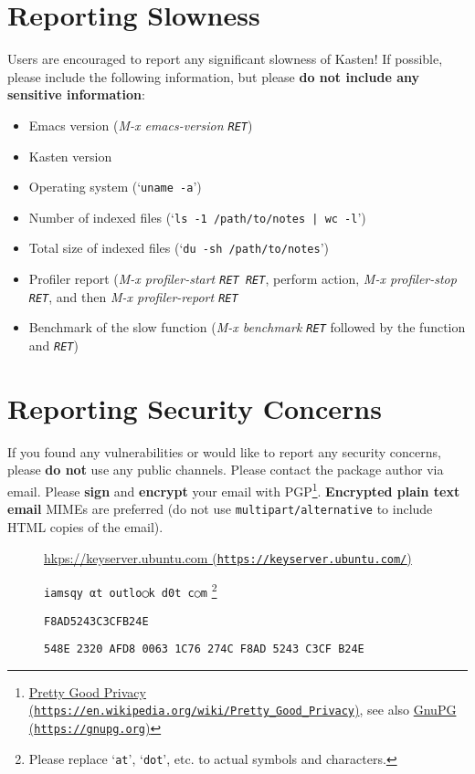 \documentclass{book}
\newcommand\Texinfocommandstyletextkbd[1]{{\ttfamily\textsl{#1}}}%
\renewcommand{\_}{\Texinfounderscore\discretionary{}{}{}}
\begin{document}
\section{{Reporting Slowness}}
\label{anchor:Reporting-Slowness}%

Users are encouraged to report any significant slowness of Kasten! If possible,
please include the following information, but please \textbf{do not include any
sensitive information}:
\begin{itemize}
\item Emacs version (\Texinfocommandstyletextkbd{M-x emacs-version \texttt{RET}})
\item Kasten version
\item Operating system (`\texttt{uname -a}')
\item Number of indexed files (`\texttt{ls -1 /path/to/notes | wc -l}')
\item Total size of indexed files (`\texttt{du -sh /path/to/notes}')
\item Profiler report (\Texinfocommandstyletextkbd{M-x profiler-start \texttt{RET}\ \texttt{RET}}, perform action,
\Texinfocommandstyletextkbd{M-x profiler-stop \texttt{RET}}, and then \Texinfocommandstyletextkbd{M-x profiler-report \texttt{RET}}
\item Benchmark of the slow function (\Texinfocommandstyletextkbd{M-x benchmark \texttt{RET}} followed by the
function and \Texinfocommandstyletextkbd{\texttt{RET}})
\end{itemize}

\section{{Reporting Security Concerns}}
\label{anchor:Reporting-Security-Concerns}%

If you found any vulnerabilities or would like to report any security concerns,
please \textbf{do not} use any public channels.  Please contact the package author via
email.  Please \textbf{sign} and \textbf{encrypt} your email with PGP\footnote{\href{https://en.wikipedia.org/wiki/Pretty_Good_Privacy}{Pretty Good Privacy (\nolinkurl{https://en.wikipedia.org/wiki/Pretty_Good_Privacy})},
see also \href{https://gnupg.org}{GnuPG (\nolinkurl{https://gnupg.org})}}.  \textbf{Encrypted plain text email} MIMEs are preferred (do not use
\texttt{multipart/alternative} to include HTML copies of the email).

\begin{description}
\item[{\parbox[b]{\linewidth}{%
Key Server}}]
\href{https://keyserver.ubuntu.com/}{hkps://keyserver.ubuntu.com (\nolinkurl{https://keyserver.ubuntu.com/})}
\item[{\parbox[b]{\linewidth}{%
Email Address}}]
\texttt{iamsqy αt outlo◯k d0t c○m} \footnote{Please replace `\texttt{at}', `\texttt{dot}', etc. to actual
symbols and characters.}
\item[{\parbox[b]{\linewidth}{%
Key ID}}]
\texttt{F8AD5243C3CFB24E}
\item[{\parbox[b]{\linewidth}{%
Primary key fingerprint}}]
\texttt{548E 2320 AFD8 0063 1C76  274C F8AD 5243 C3CF B24E}
\end{description}
\end{document}

